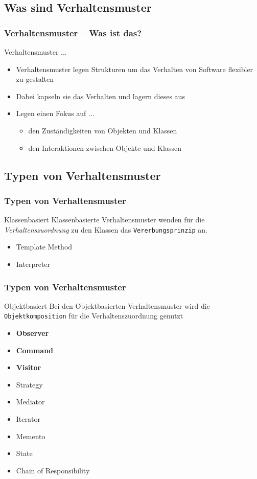 \subsection{Was sind Verhaltensmuster}


\begin{frame}
	\frametitle{Verhaltensmuster -- Was ist das?}
	\begin{block}{Verhaltensmuster ...}
	\begin{itemize}
		\item Verhaltensmuster legen Strukturen um das Verhalten von Software flexibler zu gestalten
		\item Dabei kapseln sie das Verhalten und lagern dieses aus
		\item Legen einen Fokus auf ...
		\begin{itemize}
			\item den Zuständigkeiten von Objekten und Klassen
			\item den Interaktionen zwischen Objekte und Klassen
		\end{itemize}
	\end{itemize}
	\end{block}	
\end{frame}


\subsection{Typen von Verhaltensmuster}
\begin{frame}
	\frametitle{Typen von Verhaltensmuster}
	\begin{block}{Klassenbasiert}
		Klassenbasierte Verhaltensmuster wenden für die \textit{Verhaltenszuordnung} zu den Klassen das \texttt{Vererbungsprinzip} an. 
		\begin{itemize}
			\item Template Method
			\item Interpreter
		\end{itemize} 	
	\end{block}
\end{frame}

\begin{frame}
	\frametitle{Typen von Verhaltensmuster}
	\begin{block}{Objektbasiert}
		Bei den Objektbasierten Verhaltensmuster wird die \texttt{Objektkomposition} für die Verhaltenszuordnung genutzt
				\begin{itemize}
					\item \textbf{Observer}
					\item \textbf{Command}
					\item \textbf{Visitor}
					\item Strategy			
					\item Mediator
					\item Iterator
					\item Memento 
					\item State
					\item Chain of Responsibility
				\end{itemize}	
	\end{block}
\end{frame}
